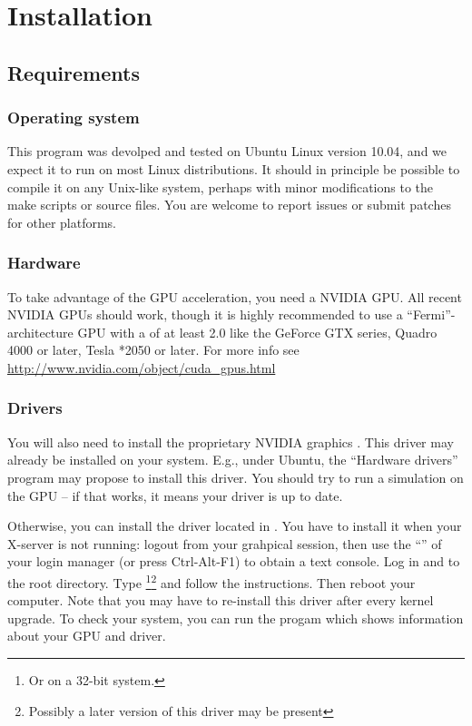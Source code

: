 \section{Installation}

\subsection{Requirements}

\subsubsection{Operating system}

This program was devolped and tested on Ubuntu Linux version 10.04, and we expect it to run on most Linux distributions. It should in principle be possible to compile it on any Unix-like system, perhaps with minor modifications to the make scripts or source files. You are welcome to report issues or submit patches for other platforms.

\subsubsection{Hardware}

To take advantage of the GPU acceleration, you need a  \textsc{NVIDIA} GPU. All recent \textsc{NVIDIA} GPUs should work, though it is highly recommended to use a ``Fermi''-architecture GPU with a  of at least 2.0 like the GeForce GTX series, Quadro 4000 or later, Tesla *2050 or later. For more info see \url{http://www.nvidia.com/object/cuda_gpus.html}

\subsubsection{Drivers}

You will also need to install the proprietary \textsc{NVIDIA} graphics . This driver may already be installed on your system. E.g., under Ubuntu, the ``Hardware drivers'' program may propose to install this driver. You should try to run a simulation on the GPU -- if that works, it means your driver is up to date.

Otherwise, you can install the driver located in . You have to install it when your X-server is not running: logout from your grahpical session, then use the ``'' of your login manager (or press Ctrl-Alt-F1) to obtain a text console. Log in and  to  the \prog root directory. Type \footnote{Or  on a 32-bit system.}\footnote{Possibly a later version of this driver may be present} and follow the instructions. Then reboot your computer. Note that you may have to re-install this driver after every kernel upgrade. To check your system, you can run the progam  which shows information about your GPU and driver.


